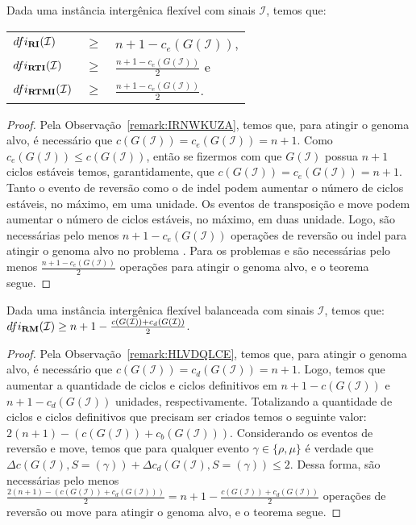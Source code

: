 \begin{theorem}\label{theorem:SZNBDWOM}
Dada uma instância intergênica flexível com sinais $\mathcal{I}$, temos que:

\begin{tabular}{lll}
  $dfi_{\textbf{RI}}(\mathcal{I})$       & $ \ge $ & ${n+1} - c_e(G(\mathcal{I} ))$,            \\
  $dfi_{\textbf{RTI}}(\mathcal{I})$      & $ \ge $ & $\frac{{n+1} - c_e(G(\mathcal{I} ))}{2}$ e \\
  $dfi_{\textbf{RTMI}}(\mathcal{I})$     & $ \ge $ & $\frac{{n+1} - c_e(G(\mathcal{I} ))}{2}$.  \\
\end{tabular}
\end{theorem}
\begin{proof}
Pela Observação~\ref{remark:IRNWKUZA}, temos que, para atingir o genoma alvo, é necessário que $c(G(\mathcal{I})) = c_e(G(\mathcal{I})) = n+1$. Como $c_e(G(\mathcal{I})) \le c(G(\mathcal{I}))$, então se fizermos com que $G(\mathcal{I})$ possua $n+1$ ciclos estáveis temos, garantidamente, que $c(G(\mathcal{I})) = c_e(G(\mathcal{I})) = n+1$. Tanto o evento de reversão como o de indel podem aumentar o número de ciclos estáveis, no máximo, em uma unidade. Os eventos de transposição e move podem aumentar o número de ciclos estáveis, no máximo, em duas unidade. Logo, são necessárias pelo menos ${n+1} - c_e(G(\mathcal{I} ))$ operações de reversão ou indel para atingir o genoma alvo no problema \SbFIRI{}. Para os problemas \SbFIRTI{} e \SbFIRTMI{} são necessárias pelo menos $\frac{{n+1} - c_e(G(\mathcal{I} ))}{2}$ operações para atingir o genoma alvo, e o teorema segue. 
\end{proof}

\begin{theorem}\label{theorem:CNMFNKPK}
Dada uma instância intergênica flexível balanceada com sinais $\mathcal{I}$, temos que: $dfi_{\textbf{RM}}(\mathcal{I}) \ge {n+1} - \frac{c(G(\mathcal{I} )) + c_d(G(\mathcal{I} ))}{2}$.
\end{theorem}
\begin{proof}
Pela Observação~\ref{remark:HLVDQLCE}, temos que, para atingir o genoma alvo, é necessário que $c(G(\mathcal{I})) = c_d(G(\mathcal{I})) = n+1$. Logo, temos que aumentar a quantidade de ciclos e ciclos definitivos em ${n+1} - c(G(\mathcal{I}))$ e ${n+1} - c_d(G(\mathcal{I}))$ unidades, respectivamente. Totalizando a quantidade de ciclos e ciclos definitivos que precisam ser criados temos o seguinte valor: $2(n+1) - (c(G(\mathcal{I})) + c_b(G(\mathcal{I})))$. Considerando os eventos de reversão e move, temos que para qualquer evento $\gamma \in \{\rho, \mu\}$ é verdade que $\Delta c(G(\mathcal{I}), S=(\gamma)) + \Delta c_d(G(\mathcal{I}), S=(\gamma)) \le 2$. Dessa forma, são necessárias pelo menos $\frac{2({n+1}) - (c(G(\mathcal{I})) + c_d(G(\mathcal{I})))}{2} = {n+1} - \frac{c(G(\mathcal{I} )) + c_d(G(\mathcal{I} ))}{2}$ operações de reversão ou move para atingir o genoma alvo, e o teorema segue. 
\end{proof}

